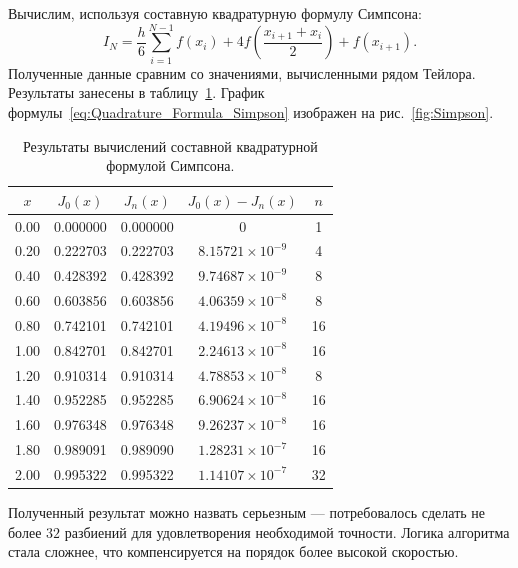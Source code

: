 \documentclass[a4paper, 14pt]{extarticle}
\begin{document}
    Вычислим, используя составную квадратурную формулу Симпсона:
    $$ I_{N} = \frac{h}{6} \sum\limits_{i=1}^{N-1} f(x_i) + 4 f\left(\frac{x_{i+1} + x_i}{2}\right) + f(x_{i+1}). $$
    Полученные данные сравним со значениями, вычисленными рядом Тейлора.
    Результаты занесены в таблицу~\ref{tab:Simpson}.
    График формулы~\eqref{eq:Quadrature_Formula_Simpson} изображен на рис.~\ref{fig:Simpson}.
    \begin{table}[H]
        \centering
        \begin{tabular}{|c|c|c|c|c|}
            \hline
            $x$  & $J_0(x)$ & $J_n(x)$ & $J_0(x)-J_n(x)$        & $n$ \\ \hline
            0.00 & 0.000000 & 0.000000 & 0                      & 1   \\ \hline
            0.20 & 0.222703 & 0.222703 & $8.15721\times10^{-9}$ & 4   \\ \hline
            0.40 & 0.428392 & 0.428392 & $9.74687\times10^{-9}$ & 8   \\ \hline
            0.60 & 0.603856 & 0.603856 & $4.06359\times10^{-8}$ & 8   \\ \hline
            0.80 & 0.742101 & 0.742101 & $4.19496\times10^{-8}$ & 16  \\ \hline
            1.00 & 0.842701 & 0.842701 & $2.24613\times10^{-8}$ & 16  \\ \hline
            1.20 & 0.910314 & 0.910314 & $4.78853\times10^{-8}$ & 8   \\ \hline
            1.40 & 0.952285 & 0.952285 & $6.90624\times10^{-8}$ & 16  \\ \hline
            1.60 & 0.976348 & 0.976348 & $9.26237\times10^{-8}$ & 16  \\ \hline
            1.80 & 0.989091 & 0.989090 & $1.28231\times10^{-7}$ & 16  \\ \hline
            2.00 & 0.995322 & 0.995322 & $1.14107\times10^{-7}$ & 32  \\ \hline
        \end{tabular}
        \caption{Результаты вычислений составной квадратурной формулой Симпсона.}
        \label{tab:Simpson}
    \end{table}

    Полученный результат можно назвать серьезным --- потребовалось сделать не более $32$ разбиений для удовлетворения
    необходимой точности.
    Логика алгоритма стала сложнее, что компенсируется на порядок более высокой скоростью.
\end{document}
